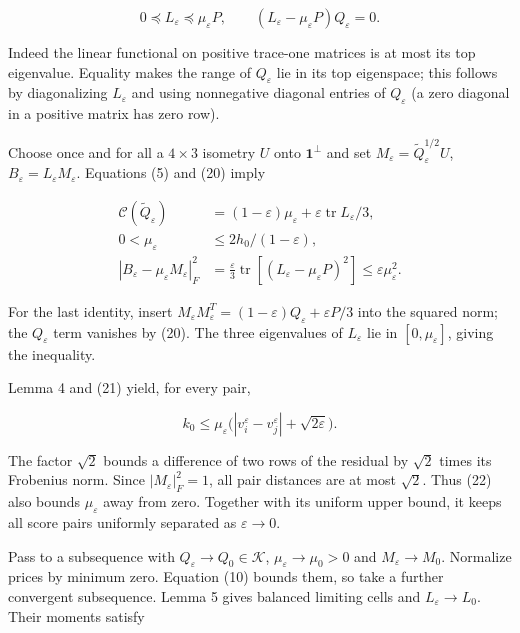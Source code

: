 \documentclass[
  11pt,
]{article}
\begin{document}
\[
 0\preceq L_\varepsilon\preceq\mu_\varepsilon P,\qquad
 (L_\varepsilon-\mu_\varepsilon P)Q_\varepsilon=0.        \tag{20}
\]

Indeed the linear functional on positive trace-one matrices is at most
its top eigenvalue. Equality makes the range of \(Q_\varepsilon\) lie in
its top eigenspace; this follows by diagonalizing \(L_\varepsilon\) and
using nonnegative diagonal entries of \(Q_\varepsilon\) (a zero diagonal
in a positive matrix has zero row).

Choose once and for all a \(4\times3\) isometry \(U\) onto
\(\mathbf1^\perp\) and set
\(M_\varepsilon=\widetilde Q_\varepsilon^{1/2}U\),
\(B_\varepsilon=L_\varepsilon M_\varepsilon\). Equations (5) and (20)
imply

\[
 \begin{split}
 \mathcal C(\widetilde Q_\varepsilon)
   &=(1-\varepsilon)\mu_\varepsilon+
                     \varepsilon\operatorname{tr}L_\varepsilon/3,\\
 0<\mu_\varepsilon&\le2h_0/(1-\varepsilon),\\
 |B_\varepsilon-\mu_\varepsilon M_\varepsilon|_F^2
   &=\frac\varepsilon3\operatorname{tr}\left[(L_\varepsilon-\mu_\varepsilon P)^2\right]
     \le\varepsilon\mu_\varepsilon^2.
 \end{split}                                           \tag{21}
\]

For the last identity, insert \(M_\varepsilon M_\varepsilon^T=
(1-\varepsilon)Q_\varepsilon+\varepsilon P/3\) into the squared norm;
the \(Q_\varepsilon\) term vanishes by (20). The three eigenvalues of
\(L_\varepsilon\) lie in \([0,\mu_\varepsilon]\), giving the inequality.

Lemma 4 and (21) yield, for every pair,

\[
 k_0\le\mu_\varepsilon
       \bigl(|v_i^\varepsilon-v_j^\varepsilon|+\sqrt{2\varepsilon}\bigr).
                                                               \tag{22}
\]

The factor \(\sqrt2\) bounds a difference of two rows of the residual by
\(\sqrt2\) times its Frobenius norm. Since \(|M_\varepsilon|_F^2=1\),
all pair distances are at most \(\sqrt2\). Thus (22) also bounds
\(\mu_\varepsilon\) away from zero. Together with its uniform upper
bound, it keeps all score pairs uniformly separated as
\(\varepsilon\to0\).

Pass to a subsequence with \(Q_\varepsilon\to Q_0\in\mathcal K\),
\(\mu_\varepsilon\to\mu_0>0\) and \(M_\varepsilon\to M_0\). Normalize
prices by minimum zero. Equation (10) bounds them, so take a further
convergent subsequence. Lemma 5 gives balanced limiting cells and
\(L_\varepsilon\to L_0\). Their moments satisfy
\end{document}
